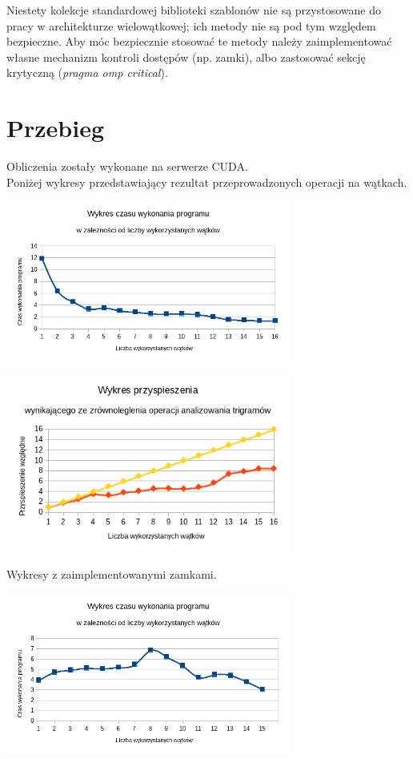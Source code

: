 \documentclass[a4paper,12pt]{article}
\begin{document}
Niestety kolekcje standardowej biblioteki szablonów nie są przystosowane do pracy w architekturze wielowątkowej; ich metody nie są pod tym względem bezpieczne. Aby móc bezpiecznie stosować te metody należy zaimplementować własne mechanizm kontroli dostępów (np. zamki), albo zastosować sekcję krytyczną (\emph{pragma omp critical}).


\section*{Przebieg}
Obliczenia zostały wykonane na serwerze CUDA. \\



Poniżej wykresy przedstawiający rezultat przeprowadzonych operacji na wątkach.
\\
\begin{center}
\includegraphics[width=0.7\textwidth]{data/wykonanie.png}
\end{center}


\begin{center}
\includegraphics[width=0.7\textwidth]{data/przyspieszenie.png}
\end{center}

Wykresy z zaimplementowanymi zamkami.
\\
\begin{center}
\includegraphics[width=0.7\textwidth]{data/wykonanie_2.png}
\end{center}
\end{document}
